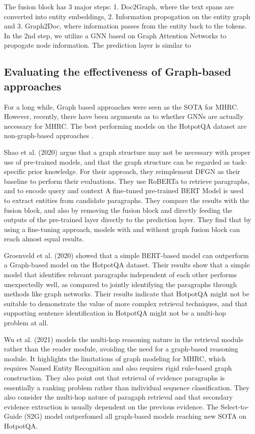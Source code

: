 \documentclass[sigplan,screen]{acmart}
\begin{document}
The fusion block has 3 major steps: 1. Doc2Graph, where the text spans are converted into entity embeddings, 2. Information propogation on the entity graph and 3. Graph2Doc, where 
information passes from the entity back to the tokens. In the 2nd step, we utilize a GNN based on Graph Attention Networks \cite{RN7} to propogate node information. The prediction layer is 
similar to \cite{RN116}




\subsection{Evaluating the effectiveness of Graph-based approaches}

For a long while, Graph based approaches were seen as the SOTA for MHRC. However, recently, there have been arguments as to whether GNNs are actually necessary for MHRC. The best performing models 
on the HotpotQA dataset \cite{RN116} are non-graph-based approaches \cite{RN105} \cite{RN149}. 

Shao et al. (2020) \cite{RN127} argue that a graph structure may not be necessary with proper use of 
pre-trained models, and that the graph structure can be regarded as task-specific prior knowledge. For their approach,
they reimplement DFGN \cite{RN122} as their baseline to perform their evaluations. They use RoBERTa \cite{RN171} to retrieve paragraphs, and to encode query and context 
A fine-tuned pre-trained BERT Model is used to extract entities from candidate paragraphs. They compare the results with the fusion block, and also by removing the fusion block and directly feeding the 
outputs of the pre-trained layer directly to the prediction layer. They find that by using a fine-tuning approach, models with and without graph fusion block can reach almost equal results.

Groenveld et al. (2020) \cite{RN126} showed that a simple BERT-based model can outperform a Graph-based model on the HotpotQA dataset.
Their results show that a simple model that identifies relavant paragraphs independent of each other performs unexpectedly well, as compared to 
jointly identifying the paragraphs through methods like graph networks. Their results indicate that HotpotQA might not be suitable to demonstrate the 
value of more complex retrieval techniques, and that supporting sentence identification in HotpotQA might not be a multi-hop problem at all.

Wu et al. (2021) \cite{RN106} models the multi-hop reasoning nature in the retrieval module rather than the reader module, avoiding the need for a graph-based reasoning module.
It highlights the limitations of graph modeling for MHRC, which requires Named Entity Recognition and also requires rigid rule-based graph construction.
They also point out that retrieval of evidence paragraphs is essentially a ranking problem rather than individual sequence classification.
They also consider the multi-hop nature of paragaph retrieval and that secondary evidence extraction is usually dependent on the previous evidence.
The Select-to-Guide (S2G) model outperfomed all graph-based models reaching new SOTA on HotpotQA.
\end{document}

